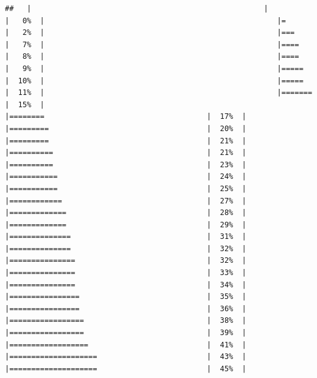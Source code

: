 \documentclass[
  krantz2]{krantz}
\begin{document}
\begin{verbatim}
##   |                                                     |                                             |   0%  |                                                     |=                                            |   2%  |                                                     |===                                          |   7%  |                                                     |====                                         |   8%  |                                                     |====                                         |   9%  |                                                     |=====                                        |  10%  |                                                     |=====                                        |  11%  |                                                     |=======                                      |  15%  |                                                     |========                                     |  17%  |                                                     |=========                                    |  20%  |                                                     |=========                                    |  21%  |                                                     |==========                                   |  21%  |                                                     |==========                                   |  23%  |                                                     |===========                                  |  24%  |                                                     |===========                                  |  25%  |                                                     |============                                 |  27%  |                                                     |=============                                |  28%  |                                                     |=============                                |  29%  |                                                     |==============                               |  31%  |                                                     |==============                               |  32%  |                                                     |===============                              |  32%  |                                                     |===============                              |  33%  |                                                     |===============                              |  34%  |                                                     |================                             |  35%  |                                                     |================                             |  36%  |                                                     |=================                            |  38%  |                                                     |=================                            |  39%  |                                                     |==================                           |  41%  |                                                     |====================                         |  43%  |                                                     |====================                         |  45%  |         
\end{verbatim}
\end{document}
